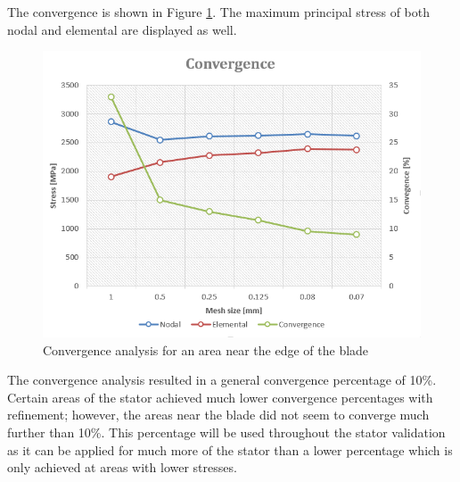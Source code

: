 The convergence is shown in Figure \ref{fig:stress_convergence}. The maximum principal stress of both nodal and elemental are displayed as well.
\begin{figure}[H]
\centering
\includegraphics[width=14cm]{Figures/partition.png}
\caption{Convergence analysis for an area near the edge of the blade}
\label{fig:stress_convergence}
\end{figure}
The convergence analysis resulted in a general convergence percentage of 10\%. Certain areas of the stator achieved much lower convergence percentages with refinement; however, the areas near the blade did not seem to converge much further than 10\%. This percentage will be used throughout the stator validation as it can be applied for much more of the stator than a lower percentage which is only achieved at areas with lower stresses.